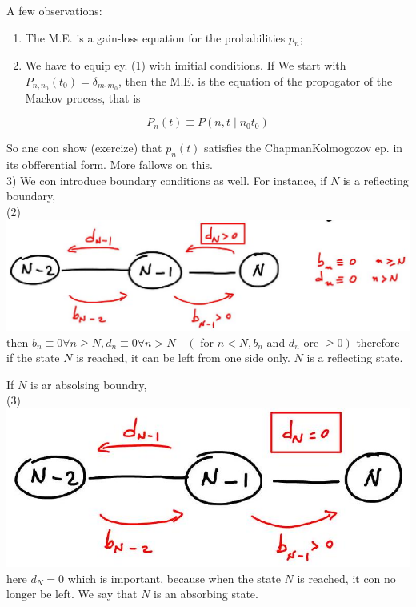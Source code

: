 \documentclass[10pt]{article}
\begin{document}
A few observations:

\begin{enumerate}
  \item The M.E. is a gain-loss equation for the probabilities $p_{n}$;
  \item We have to equip ey. (1) with imitial conditions. If We start with $P_{n, n_{0}}\left(t_{0}\right)=\delta_{m_{1} m_{0}}$, then the M.E. is the equation of the propogator of the Mackov process, that is
\end{enumerate}

$$
P_{n}(t) \equiv P\left(n, t \mid n_{0} t_{0}\right)
$$

So ane con show (exercize) that $p_{n}(t)$ satisfies the ChapmanKolmogozov ep. in its obfferential form. More fallows on this.\\
3) We con introduce boundary conditions as well. For instance, if $N$ is a reflecting boundary,\\
(2)\\
\includegraphics[max width=\textwidth, center]{2025_10_17_3daf2a002a8f5936c90eg-02}\\
then $b_{n} \equiv 0 \forall n \geqslant N, d_{n} \equiv 0 \forall n>N \quad\left(\right.$ for $n<N, b_{n}$ and $d_{n}$ ore $\left.\geqslant 0\right)$ therefore if the state $N$ is reached, it can be left from one side only. $N$ is a reflecting state.

If $N$ is ar absolsing boundry,\\
(3)\\
\includegraphics[max width=\textwidth, center]{2025_10_17_3daf2a002a8f5936c90eg-03}\\
here $d_{N}=0$ which is important, because when the state $N$ is reached, it con no longer be left. We say that $N$ is an absorbing state.
\end{document}
